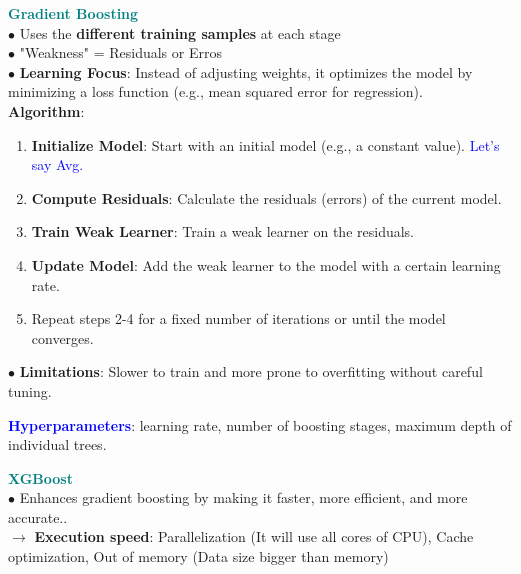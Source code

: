 \documentclass[letterpaper, 10.5pt,landscape]{article}
\begin{document}
\begin{multicols*}{3}
\vspace{3pt}
\textcolor{teal}{\textbf{Gradient Boosting}} \\
$\bullet$ Uses the \textbf{different training samples} at each stage \\
$\bullet$ "Weakness" =  Residuals or Erros \\
$\bullet$ \textbf{Learning Focus}: Instead of adjusting weights, it optimizes the model by minimizing a loss function (e.g., mean squared error for regression).\\
\textbf{Algorithm}:
\vspace{-3pt}
\begin{enumerate}
    \item \textbf{Initialize Model}: Start with an initial model (e.g., a constant value). \textcolor{blue}{Let's say Avg.}
    \vspace{-3pt}
    \item \textbf{Compute Residuals}: Calculate the residuals (errors) of the current model.
    \vspace{-3pt}
    \item \textbf{Train Weak Learner}: Train a weak learner on the residuals.
    \vspace{-3pt}
    \item \textbf{Update Model}: Add the weak learner to the model with a certain learning rate.
    \vspace{-3pt}
    \item Repeat steps 2-4 for a fixed number of iterations or until the model converges.
\end{enumerate}
$\bullet$ \textbf{Limitations}: Slower to train and more prone to overfitting without careful tuning.

\textbf{\textcolor{blue}{Hyperparameters}}: learning rate, number of boosting stages, maximum depth of individual trees.




\vspace{3pt}
\textcolor{teal}{\textbf{XGBoost}} \\
$\bullet$ Enhances gradient boosting by making it faster, more efficient, and more accurate.. \\
$\rightarrow$ \textbf{Execution speed}: Parallelization (It will use all cores of CPU), Cache optimization, Out of memory (Data size bigger than memory) \\


\end{multicols*}
\end{document}
